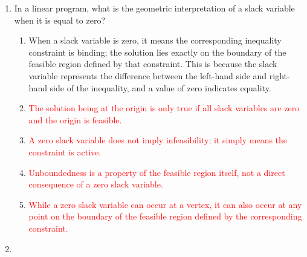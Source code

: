 \documentclass{article}%
\newcommand{\incorrect}[1]{\textcolor{red}{#1}}
\begin{document}
\begin{enumerate}
\begin{enumerate}
\item \incorrect{The linearity of the objective function is a characteristic of the problem itself, not a consequence of introducing slack variables.}%
\item Slack variables are essential because they convert inequality constraints into equality constraints, which is the standard form required for the simplex method to operate.  The simplex method relies on the ability to represent the constraints as a system of linear equations, and slack variables provide the necessary mechanism to achieve this.%
\item \incorrect{While the introduction of slack variables often leads to a basic feasible solution, it's not a guaranteed outcome in all cases (e.g., if the origin is not feasible).}%
\item \incorrect{Slack variables do not directly simplify the calculation of the objective function's value; their role is in transforming the constraints.}%
\end{enumerate}%
\vspace{1em}%
\item In a linear program, what is the geometric interpretation of a slack variable when it is equal to zero?%
\begin{enumerate}%
\item When a slack variable is zero, it means the corresponding inequality constraint is binding; the solution lies exactly on the boundary of the feasible region defined by that constraint.  This is because the slack variable represents the difference between the left-hand side and right-hand side of the inequality, and a value of zero indicates equality.%
\item \incorrect{The solution being at the origin is only true if all slack variables are zero and the origin is feasible.}%
\item \incorrect{A zero slack variable does not imply infeasibility; it simply means the constraint is active.}%
\item \incorrect{Unboundedness is a property of the feasible region itself, not a direct consequence of a zero slack variable.}%
\item \incorrect{While a zero slack variable can occur at a vertex, it can also occur at any point on the boundary of the feasible region defined by the corresponding constraint.}%
\end{enumerate}%
\vspace{1em}%
\item%
\begin{enumerate}%

\end{enumerate}
\end{enumerate}
\end{document}
